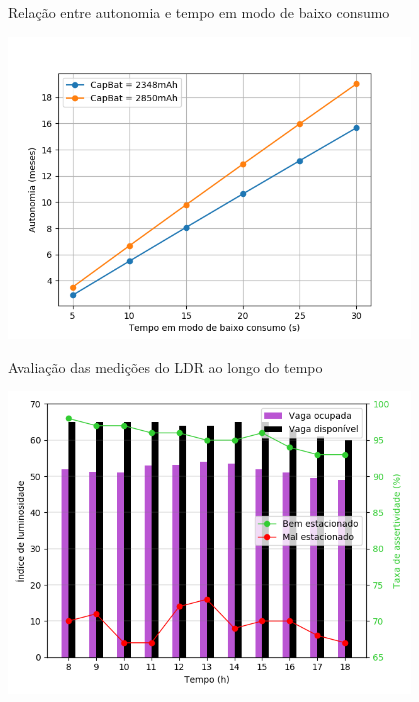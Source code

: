 \documentclass[oneside,openright,12pt]{ufsm_2015} %
\begin{document}
\begin{grafico}[ht]
     	    \caption{\label{exepretex} Relação entre autonomia e tempo em modo de baixo consumo}
            \centering
            \includegraphics[width=0.8\textwidth]{figuras/autonomias_plot.png}
            \vspace{\baselineskip} %
            \label{graph:autonomias}
    \end{grafico}

\begin{grafico}[H]
     	    \caption{\label{exepretex} Avaliação das medições do LDR ao longo do tempo}
            \centering
            \includegraphics[width=0.8\textwidth]{figuras/ldr_evaluation.png}
            \vspace{\baselineskip} %
            \label{graph:ldr-aval}
    \end{grafico}
\end{document}
